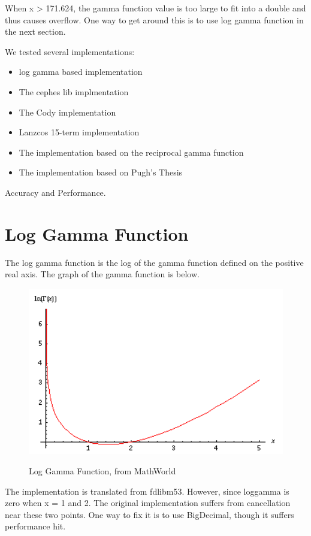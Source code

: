 When x > 171.624, the gamma function value is too large to fit into a double and thus causes overflow. One way to get around this is to use log gamma function in the next section.

We tested several implementations:
\begin{itemize}
\item log gamma based implementation
\item The cephes lib implmentation
\item The Cody implementation
\item Lanzcos 15-term implementation
\item The implementation based on the reciprocal gamma function
\item The implementation based on Pugh's Thesis
\end{itemize}
Accuracy and Performance.

\section{Log Gamma Function}
The log gamma function is the log of the gamma function defined on the positive real axis. The graph of the gamma function is below. 
\begin{figure}[htp]
\begin{center}
{
\includegraphics[bb=-90 0 300 200,width=1\textwidth] {chap3/loggamma.png}
}
\end{center}
\caption{Log Gamma Function, from MathWorld}
\label{figure:loggammafunction}
\end{figure}

The implementation is translated from fdlibm53. However, since loggamma is zero when x = 1 and 2. The original implementation suffers from cancellation near these two points. One way to fix it is to use BigDecimal, though it suffers performance hit. 

